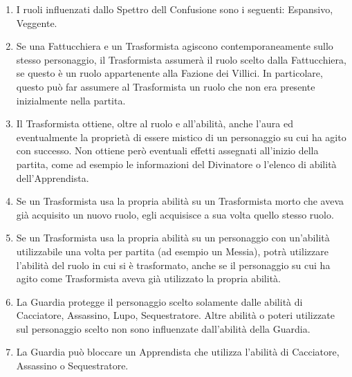 \documentclass[a4paper,10pt]{article}
\begin{document}
\begin{enumerate}
	\item I ruoli influenzati dallo Spettro dell Confusione sono i seguenti: Espansivo, Veggente.

	\item Se una Fattucchiera e un Trasformista agiscono contemporaneamente sullo stesso personaggio, il Trasformista assumerà il ruolo scelto dalla Fattucchiera, se questo è un ruolo appartenente alla Fazione dei Villici. In particolare, questo può far assumere al Trasformista un ruolo che non era presente inizialmente nella partita.

	\item Il Trasformista ottiene, oltre al ruolo e all'abilità, anche l'aura ed eventualmente la proprietà di essere mistico di un personaggio su cui ha agito con successo. Non ottiene però eventuali effetti assegnati all'inizio della partita, come ad esempio le informazioni del Divinatore o l'elenco di abilità dell'Apprendista.

	\item Se un Trasformista usa la propria abilità su un Trasformista morto che aveva già acquisito un nuovo ruolo, egli acquisisce a sua volta quello stesso ruolo. %

	\item Se un Trasformista usa la propria abilità su un personaggio con un'abilità utilizzabile una volta per partita (ad esempio un Messia), potrà utilizzare l'abilità del ruolo in cui si è trasformato, anche se il personaggio su cui ha agito come Trasformista aveva già utilizzato la propria abilità.

	\item La Guardia protegge il personaggio scelto solamente dalle abilità di Cacciatore, Assassino, Lupo, Sequestratore. Altre abilità o poteri utilizzate sul personaggio scelto non sono influenzate dall'abilità della Guardia.

	\item La Guardia può bloccare un Apprendista che utilizza l'abilità di Cacciatore, Assassino o Sequestratore.


\end{enumerate}
\end{document}

